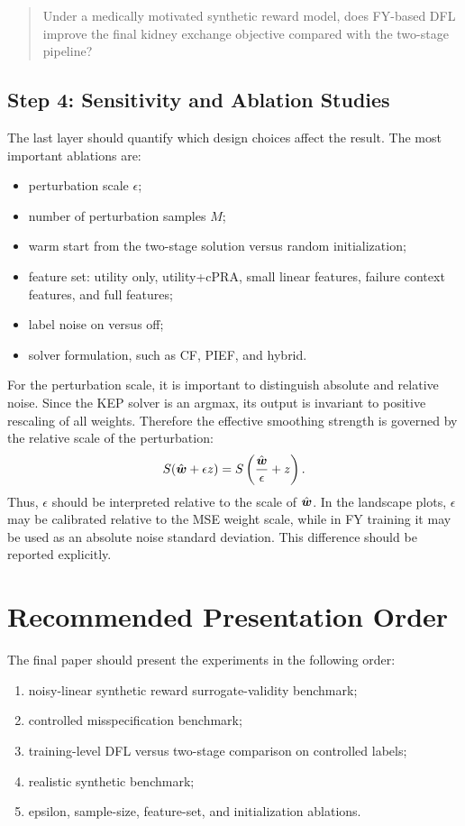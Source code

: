 \documentclass{article}
\begin{document}
\begin{quote}
Under a medically motivated synthetic reward model, does FY-based DFL improve
the final kidney exchange objective compared with the two-stage pipeline?
\end{quote}

\subsection{Step 4: Sensitivity and Ablation Studies}

The last layer should quantify which design choices affect the result. The most
important ablations are:
\begin{itemize}
    \item perturbation scale \(\epsilon\);
    \item number of perturbation samples \(M\);
    \item warm start from the two-stage solution versus random initialization;
    \item feature set: utility only, utility+cPRA, small linear features,
    failure context features, and full features;
    \item label noise on versus off;
    \item solver formulation, such as CF, PIEF, and hybrid.
\end{itemize}

For the perturbation scale, it is important to distinguish absolute and relative
noise. Since the KEP solver is an argmax, its output is invariant to positive
rescaling of all weights. Therefore the effective smoothing strength is governed
by the relative scale of the perturbation:
\[
    S(\hat {\boldsymbol{w}}+\epsilon z)
    =
    S\left(\frac{\hat {\boldsymbol{w}}}{\epsilon}+z\right).
\]
Thus, \(\epsilon\) should be interpreted relative to the scale of
\(\hat {\boldsymbol{w}}\). In the landscape plots, \(\epsilon\) may be calibrated relative to
the MSE weight scale, while in FY training it may be used as an absolute
noise standard deviation. This difference should be reported explicitly.

\section{Recommended Presentation Order}

The final paper should present the experiments in the following order:
\begin{enumerate}
    \item noisy-linear synthetic reward surrogate-validity benchmark;
    \item controlled misspecification benchmark;
    \item training-level DFL versus two-stage comparison on controlled labels;
    \item realistic synthetic benchmark;
    \item epsilon, sample-size, feature-set, and initialization ablations.
\end{enumerate}
\end{document}
